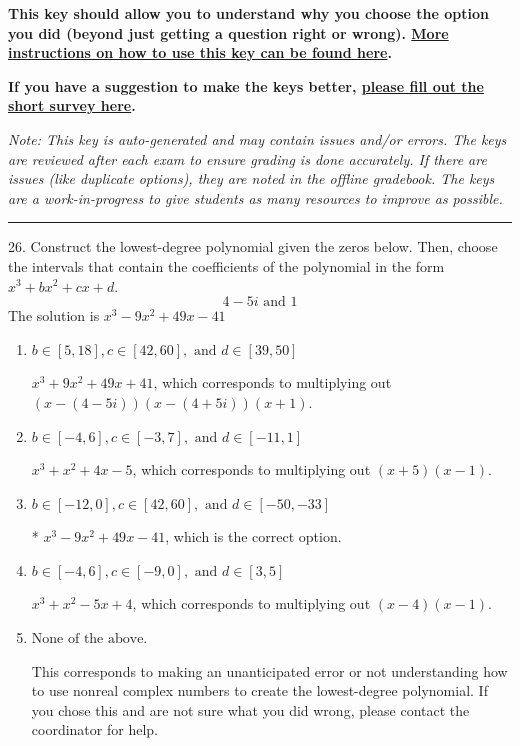 \documentclass{extbook}[14pt]
\begin{document}
\textbf{This key should allow you to understand why you choose the option you did (beyond just getting a question right or wrong). \href{https://xronos.clas.ufl.edu/mac1105spring2020/courseDescriptionAndMisc/Exams/LearningFromResults}{More instructions on how to use this key can be found here}.}

\textbf{If you have a suggestion to make the keys better, \href{https://forms.gle/CZkbZmPbC9XALEE88}{please fill out the short survey here}.}

\textit{Note: This key is auto-generated and may contain issues and/or errors. The keys are reviewed after each exam to ensure grading is done accurately. If there are issues (like duplicate options), they are noted in the offline gradebook. The keys are a work-in-progress to give students as many resources to improve as possible.}

\rule{\textwidth}{0.4pt}

26. Construct the lowest-degree polynomial given the zeros below. Then, choose the intervals that contain the coefficients of the polynomial in the form $x^3+bx^2+cx+d$.
\[ 4 - 5i \text{ and } 1 \] 
The solution is $ x^{3} -9 x^{2} +49 x -41 $ 

\begin{enumerate}[label=\Alph*.] 
\item $ b \in [5, 18], c \in [42, 60], \text{ and } d \in [39, 50] $ 

 $x^{3} +9 x^{2} +49 x + 41$, which corresponds to multiplying out $(x-(4 - 5i))(x-(4 + 5i))(x + 1)$. 
\item $ b \in [-4, 6], c \in [-3, 7], \text{ and } d \in [-11, 1] $ 

 $x^{3} + x^{2} +4 x -5$, which corresponds to multiplying out $(x + 5)(x -1)$. 
\item $ b \in [-12, 0], c \in [42, 60], \text{ and } d \in [-50, -33] $ 

 * $x^{3} -9 x^{2} +49 x -41$, which is the correct option. 
\item $ b \in [-4, 6], c \in [-9, 0], \text{ and } d \in [3, 5] $ 

 $x^{3} + x^{2} -5 x + 4$, which corresponds to multiplying out $(x -4)(x -1)$. 
\item $ \text{None of the above.} $ 

 This corresponds to making an unanticipated error or not understanding how to use nonreal complex numbers to create the lowest-degree polynomial. If you chose this and are not sure what you did wrong, please contact the coordinator for help. 
\end{enumerate} 
 
\end{document}
